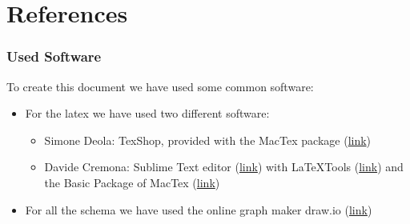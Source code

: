 \documentclass[../../dd.tex]{subfiles}
\begin{document}
	\chapter{References}
		\subsection{Used Software}
		To create this document we have used some common software:
		\begin{itemize}
			\item For the latex we have used two different software:
			\begin{itemize}
			
			\item Simone Deola: TexShop, provided with the MacTex package 					(\href{https://tug.org/mactex/}{link})
			
		\item Davide Cremona: Sublime Text editor (\href{http://www.sublimetext.com}{link}) with LaTeXTools (\href{https://github.com/SublimeText/LaTeXTools}{link}) and the Basic Package of MacTex (\href{https://tug.org/mactex/}{link})

			\end{itemize}
			
			\item For all the schema we have used the online graph maker draw.io (\href{https://www.draw.io}{link})
		\end{itemize}
		
		
\end{document}
